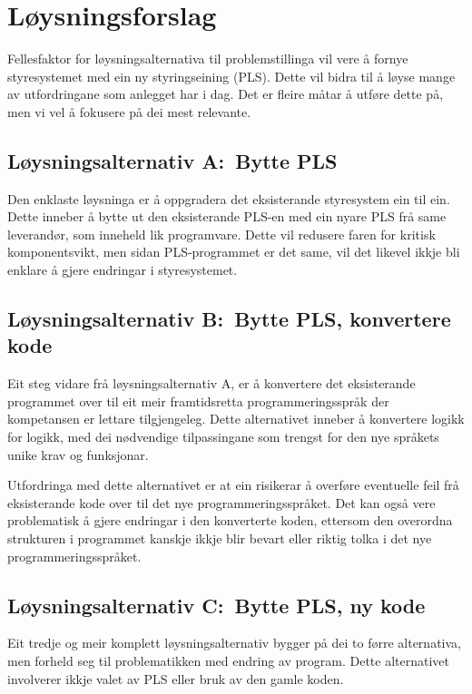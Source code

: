 \newpage
\section{Løysningsforslag}

Fellesfaktor for løysningsalternativa til problemstillinga vil vere å fornye
styresystemet med ein ny styringseining (\gls{PLS}). 
Dette vil bidra til å løyse mange av utfordringane som anlegget har i dag.\newline
Det er fleire måtar å utføre dette på, men vi vel å fokusere på dei mest relevante.

\subsection{Løysningsalternativ A:~Bytte \gls{PLS}}
Den enklaste løysninga er å oppgradera det eksisterande styresystem ein til ein. 
Dette inneber å bytte ut den eksisterande \gls{PLS}-en med ein nyare \gls{PLS} frå same leverandør, som inneheld lik programvare.\newline
Dette vil redusere faren for kritisk komponentsvikt, men sidan \gls{PLS}-programmet er det same, 
vil det likevel ikkje bli enklare å gjere endringar i styresystemet.

\subsection{Løysningsalternativ B:~Bytte \gls{PLS}, konvertere kode}
Eit steg vidare frå løysningsalternativ A, er å konvertere det eksisterande programmet over til eit meir
framtidsretta programmeringsspråk der kompetansen er lettare tilgjengeleg. Dette alternativet inneber å konvertere logikk for logikk,
med dei nødvendige tilpassingane som trengst for den nye språkets unike krav og funksjonar.

Utfordringa med dette alternativet er at ein risikerar å overføre eventuelle feil frå eksisterande
kode over til det nye programmeringsspråket. Det kan også vere problematisk å gjere endringar
i den\newline
konverterte koden, ettersom den overordna strukturen i programmet
kanskje ikkje blir bevart eller riktig tolka i det nye programmeringsspråket.

\subsection{Løysningsalternativ C:~Bytte \gls{PLS}, ny kode}
Eit tredje og meir komplett løysningsalternativ bygger på dei to førre alternativa, men forheld seg til problematikken med endring av program.
Dette alternativet involverer ikkje valet av \gls{PLS} eller bruk av den gamle koden.

